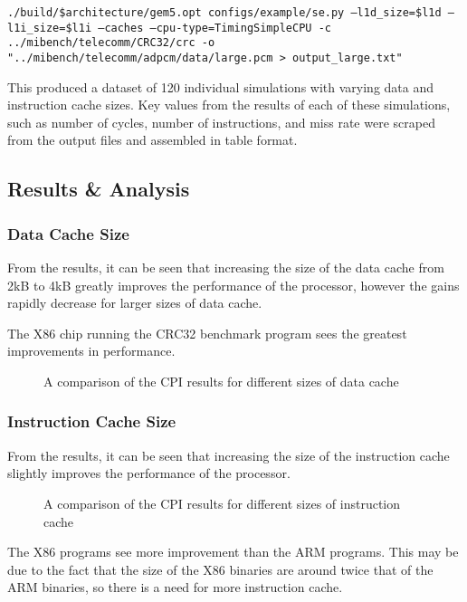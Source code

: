 \texttt{./build/\${architecture}/gem5.opt configs/example/se.py --l1d\_size=\${l1d} --l1i\_size=\${l1i} --caches --cpu-type=TimingSimpleCPU -c ../mibench/telecomm/CRC32/crc -o "../mibench/telecomm/adpcm/data/large.pcm > output\_large.txt"}

This produced a dataset of 120 individual simulations with varying data and instruction
cache sizes.
Key values from the results of each of these simulations, such as number of cycles, 
number of instructions, and miss rate were scraped from the output files and assembled 
in table format.

\subsection{Results \& Analysis}

\subsubsection{Data Cache Size}

From the results, it can be seen that increasing the size of the data cache from 2kB to 
4kB greatly improves the performance of the processor, however the gains rapidly 
decrease for larger sizes of data cache.

The X86 chip running the CRC32 benchmark program sees the greatest improvements in 
performance.

\begin{figure}[H]
    \centering
    
    \caption{A comparison of the CPI results for different sizes of data cache}
    \label{fig:parta-l1d}
\end{figure}

\subsubsection{Instruction Cache Size}

From the results, it can be seen that increasing the size of the instruction cache 
slightly improves the performance of the processor.

\begin{figure}[H]
    \centering
    
    \caption{A comparison of the CPI results for different sizes of instruction cache}
    \label{fig:parta-l1i}
\end{figure}

The X86 programs see more improvement than the ARM programs.
This may be due to the fact that the size of the X86 binaries are around twice that of 
the ARM binaries, so there is a need for more instruction cache.
